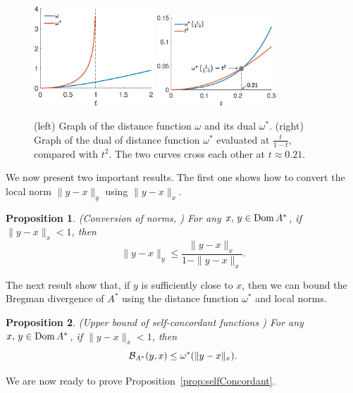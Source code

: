 \documentclass[twoside]{article}
\newtheorem{proposition}{Proposition}
\newcommand{\logpart}{A}
\newcommand{\bregmanconj}{\cB_{\logpart^*}}
\begin{document}
\begin{figure}[ht]
	\centering
	\includegraphics[width=0.4\textwidth]{figs/self_concordance/omega.eps}
	\includegraphics[width=0.4\textwidth]{figs/self_concordance/omega_star.eps}
	\caption{(left) Graph of the distance function $\omega$ and its dual $\omega^*$. (right) Graph of the dual of distance function $\omega^*$ evaluated at $\frac{t}{1-t}$, compared with $t^2$. The two curves cross each other at $t\approx 0.21$.}
	\label{fig:omega}
\end{figure}

We now present two important results. The first one shows how to convert the local norm $\|y-x\|_y$ using $\|y-x\|_x$.
\begin{proposition}\label{prop:conversion_norm}
	(Conversion of norms, \citep[Theorem 4.1.5]{nesterov2003introductory}) For any $x,\,y\in\operatorname{\mathrm{Dom}} A^*$, if $\|y-x\|_x<1$, then
	\[
		\|y-x\|_y \leq \frac{\|y-x\|_x}{1-\|y-x\|_x}.
	\]
\end{proposition}

The next result show that, if $y$ is sufficiently close to $x$, then we can bound the Bregman divergence of $A^*$ using the distance function $\omega^*$ and local norms.
\begin{proposition}(Upper bound of self-concordant functions \citep[Theorem 4.1.8]{nesterov2003introductory}) \label{prop:upper_bound_self_concordance}
	For any $x,\,y\in\operatorname{\mathrm{Dom}} A^*$, if $\|y-x\|_x<1$, then
	\[
		\bregmanconj(y,x) \leq \omega^*(\|y-x\|_x).
	\]
\end{proposition}

We are now ready to prove Proposition~\ref{prop:selfConcordant}.
\end{document}
